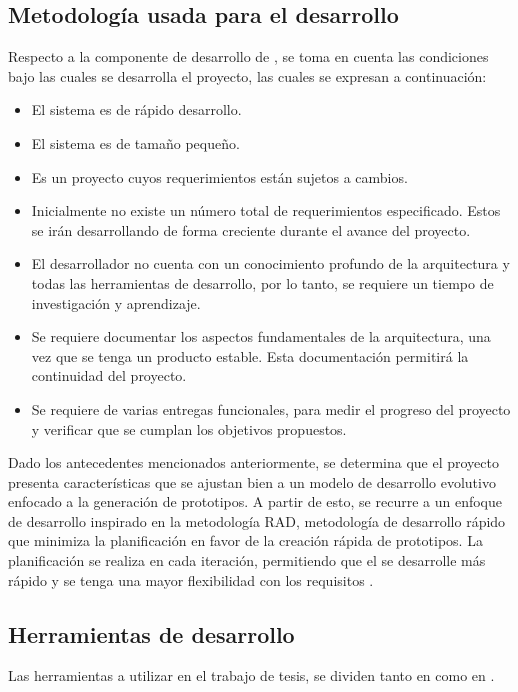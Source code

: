 \subsection*{Metodología usada para el desarrollo}
Respecto a la componente de desarrollo de , se toma en cuenta las condiciones bajo las cuales se desarrolla el proyecto, las cuales se expresan a continuación:

\begin{itemize}
	\item El sistema es de rápido desarrollo.
	\item El sistema es de tamaño pequeño.
	\item Es un proyecto cuyos requerimientos están sujetos a cambios.
	\item Inicialmente no existe un número total de requerimientos especificado. Estos se irán desarrollando de forma creciente durante el avance del proyecto.
	\item El desarrollador no cuenta con un conocimiento profundo de la arquitectura y todas las herramientas de desarrollo, por lo tanto, se requiere un tiempo de investigación y aprendizaje.   
	\item Se requiere documentar los aspectos fundamentales de la arquitectura, una vez que se tenga un producto estable. Esta documentación permitirá la continuidad del proyecto. 
	\item Se requiere de varias entregas funcionales, para medir el progreso del proyecto y verificar que se cumplan los objetivos propuestos.
\end{itemize}

Dado los antecedentes mencionados anteriormente, se determina que el proyecto presenta características que se ajustan bien a un modelo de desarrollo evolutivo enfocado a la generación de prototipos. A partir de esto, se recurre a un enfoque de desarrollo inspirado en la metodología RAD, metodología de desarrollo rápido que minimiza la planificación en favor de la creación rápida de prototipos. La planificación se realiza en cada iteración, permitiendo que el  se desarrolle más rápido y se tenga una mayor flexibilidad con los requisitos \parencite{mcconnell1996rapid}.

\subsection{Herramientas de desarrollo}
\label{subsec:herramientas}
Las herramientas a utilizar en el trabajo de tesis, se dividen tanto en  como en .

